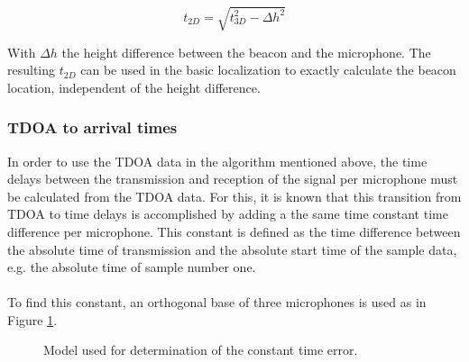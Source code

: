 \documentclass[final]{scrreprt} %
\begin{document}
\begin{equation}
	t_{2D} = \sqrt{t_{3D}^2 - \Delta h^2}
\end{equation}

With $\Delta h$ the height difference between the beacon and the microphone.
The resulting $t_{2D}$ can be used in the basic localization to exactly calculate the beacon location, independent of the height difference.

\subsubsection{TDOA to arrival times}
In order to use the TDOA data in the algorithm mentioned above, the time delays between the transmission and reception of the signal per microphone must be calculated from the TDOA data.
For this, it is known that this transition from TDOA to time delays is accomplished by adding a the same time constant time difference per microphone.
This constant is defined as the time difference between the absolute time of transmission and the absolute start time of the sample data, e.g. the absolute time of sample number one.
\\ \\
To find this constant, an orthogonal base of three microphones is used as in Figure \ref{fig:constant}.

\begin{figure} [H]
\centering
	\caption{Model used for determination of the constant time error.}
	\label{fig:constant}
\end{figure}
\end{document}
